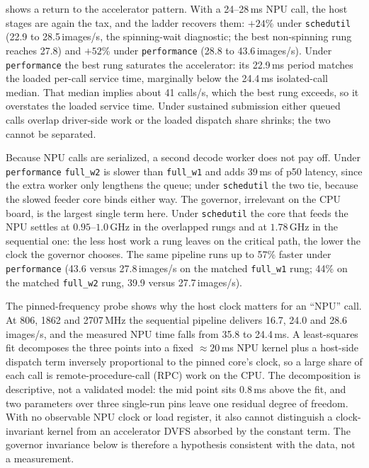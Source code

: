  shows a return to the accelerator pattern.
With a 24--28\,ms NPU call, the host stages are again the tax, and the
ladder recovers them: $+24$\% under \texttt{schedutil} (22.9 to
28.5\,images/s, the spinning-wait diagnostic; the best non-spinning
rung reaches 27.8) and $+52$\% under \texttt{performance} (28.8 to
43.6\,images/s). Under \texttt{performance} the best rung saturates
the accelerator: its 22.9\,ms period matches the loaded per-call
service time, marginally below the 24.4\,ms isolated-call median. That
median implies about 41 calls/s, which the best rung exceeds, so it
overstates the loaded service time. Under sustained
submission either queued calls overlap driver-side work or the loaded
dispatch share shrinks; the two cannot be separated.

Because NPU calls are serialized, a second decode worker does not pay
off. Under \texttt{performance} \texttt{full\_w2} is slower than
\texttt{full\_w1} and adds 39\,ms of p50 latency, since the extra
worker only lengthens the queue; under \texttt{schedutil} the two tie,
because the slowed feeder core binds either way. The governor,
irrelevant on the CPU board, is the largest single term here. Under
\texttt{schedutil} the core that feeds the NPU settles at
$0.95$--$1.0$\,GHz in the overlapped rungs and at $1.78$\,GHz in the
sequential one: the less host work a rung leaves on the critical path,
the lower the clock the governor chooses. The same pipeline runs up to
57\% faster under \texttt{performance} (43.6 versus 27.8\,images/s on
the matched \texttt{full\_w1} rung; 44\% on the matched
\texttt{full\_w2} rung, 39.9 versus 27.7\,images/s).

The pinned-frequency probe shows why the host clock matters for an
``NPU'' call. At 806, 1862 and 2707\,MHz the sequential pipeline
delivers 16.7, 24.0 and 28.6\,images/s, and the measured NPU time
falls from 35.8 to 24.4\,ms. A least-squares fit decomposes the three
points into a fixed ${\approx}20$\,ms NPU kernel plus a host-side
dispatch term inversely proportional to the pinned core's clock, so a
large share of each call is remote-procedure-call (RPC) work on the
CPU. The decomposition is descriptive, not a validated model: the mid
point sits $0.8$\,ms above the fit, and two parameters over three
single-run pins leave one residual degree of freedom. With no
observable NPU clock or load register, it also cannot distinguish a
clock-invariant kernel from an accelerator DVFS absorbed by the
constant term. The governor invariance below is therefore a hypothesis
consistent with the data, not a measurement.


